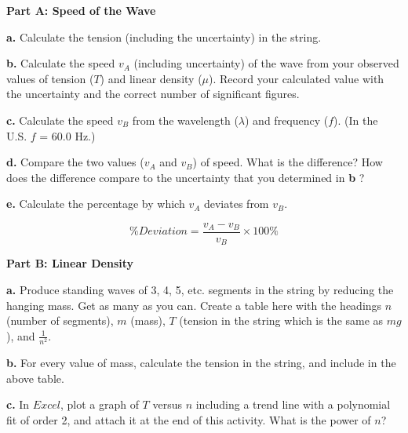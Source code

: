 \textbf{Part A: Speed of the Wave }

\textbf{a. } Calculate the tension (including the uncertainty) in the string.

\vspace{3cm}

\newpage

\textbf{b. } Calculate the speed $v_A$ (including uncertainty) of the wave from your observed values of tension
($T$) and linear density ($\mu $). Record your calculated value with the uncertainty and the correct number of significant
figures.


\vspace{4cm}

\textbf{c. } Calculate the speed $v_B$ from the wavelength ($\lambda $) and frequency ($f$). (In the U.S. $f$ = 60.0 Hz.)

\vspace{4cm}

\textbf{d. } Compare the two values ($v_A$ and $v_B$) of speed. What is the difference? How does the difference compare
to the uncertainty that you determined in \textbf{b }?

\vspace{4cm}

\textbf{e. } Calculate the percentage by which $v_A$ deviates from $v_B$.

\begin{equation}
\% Deviation =\frac {v_A - v_B}{v_B} \times 100\%
\end{equation}

\vspace{3cm}

\newpage

\textbf{Part B: Linear Density}

\textbf{a. } Produce standing waves of 3, 4, 5, etc. segments in the string by reducing the hanging mass. Get as many as you can. Create a table here with the headings $n$ (number of segments), $m$ (mass), $T$ (tension in the string which is the same as $mg$), and $\frac{1}{n^2}$.

\vspace{6cm}

\textbf{b. } For every value of mass, calculate the tension in the string, and include in the above table.

\textbf{c. } In $Excel$, plot a graph of $T$ versus $n$ including a trend line with a polynomial fit of order 2, and attach it at the end of this activity. What is the power of $n$?
\vspace{20mm}

